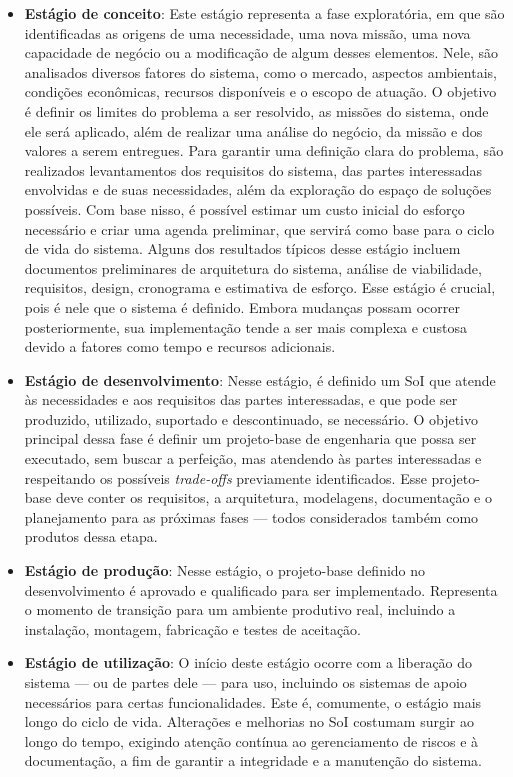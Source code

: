 	\begin{itemize}
		\item \textbf{Estágio de conceito}: Este estágio representa a fase exploratória, em que são identificadas as origens de uma necessidade, uma nova missão, uma nova capacidade de negócio ou a modificação de algum desses elementos. Nele, são analisados diversos fatores do sistema, como o mercado, aspectos ambientais, condições econômicas, recursos disponíveis e o escopo de atuação. O objetivo é definir os limites do problema a ser resolvido, as missões do sistema, onde ele será aplicado, além de realizar uma análise do negócio, da missão e dos valores a serem entregues. Para garantir uma definição clara do problema, são realizados levantamentos dos requisitos do sistema, das partes interessadas envolvidas e de suas necessidades, além da exploração do espaço de soluções possíveis. Com base nisso, é possível estimar um custo inicial do esforço necessário e criar uma agenda preliminar, que servirá como base para o ciclo de vida do sistema. Alguns dos resultados típicos desse estágio incluem documentos preliminares de arquitetura do sistema, análise de viabilidade, requisitos, design, cronograma e estimativa de esforço. Esse estágio é crucial, pois é nele que o sistema é definido. Embora mudanças possam ocorrer posteriormente, sua implementação tende a ser mais complexa e custosa devido a fatores como tempo e recursos adicionais.

		\item \textbf{Estágio de desenvolvimento}: Nesse estágio, é definido um SoI que atende às necessidades e aos requisitos das partes interessadas, e que pode ser produzido, utilizado, suportado e descontinuado, se necessário. O objetivo principal dessa fase é definir um projeto-base de engenharia que possa ser executado, sem buscar a perfeição, mas atendendo às partes interessadas e respeitando os possíveis \textit{trade-offs} previamente identificados. Esse projeto-base deve conter os requisitos, a arquitetura, modelagens, documentação e o planejamento para as próximas fases — todos considerados também como produtos dessa etapa.

		\item \textbf{Estágio de produção}: Nesse estágio, o projeto-base definido no desenvolvimento é aprovado e qualificado para ser implementado. Representa o momento de transição para um ambiente produtivo real, incluindo a instalação, montagem, fabricação e testes de aceitação.

		\item \textbf{Estágio de utilização}: O início deste estágio ocorre com a liberação do sistema — ou de partes dele — para uso, incluindo os sistemas de apoio necessários para certas funcionalidades. Este é, comumente, o estágio mais longo do ciclo de vida. Alterações e melhorias no SoI costumam surgir ao longo do tempo, exigindo atenção contínua ao gerenciamento de riscos e à documentação, a fim de garantir a integridade e a manutenção do sistema.


\end{itemize}
